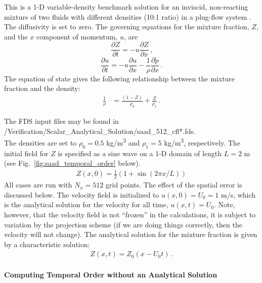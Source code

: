 \documentclass[11pt]{book}
\begin{document}
\noindent This is a 1-D variable-density benchmark solution for an inviscid, non-reacting mixture of two fluids with different densities (10:1 ratio) in a plug-flow system \cite{Biglari:2013}.  The diffusivity is set to zero.  The governing equations for the mixture fraction, $Z$, and the $x$ component of momentum, $u$, are
\begin{equation}
\frac{\partial Z}{\partial t} = - u\frac{\partial Z}{\partial x} \,\mbox{,}
\end{equation}
\begin{equation}
\frac{\partial u}{\partial t} = - u\frac{\partial u}{\partial x} - \frac{1}{\rho} \frac{\partial \tilde{p}}{\partial x} \,\mbox{.}
\end{equation}
The equation of state gives the following relationship between the mixture fraction and the density:
\begin{align}
\frac{1}{\rho} &= \frac{(1-Z)}{\rho_0} + \frac{Z}{\rho_1} \,\mbox{.}
\end{align}

The FDS input files may be found in\\
{\ct /Verification/Scalar\_Analytical\_Solution/saad\_512\_cfl*.fds}.\\

\noindent The densities are set to $\rho_0 = 0.5$ \si{kg/m^3} and $\rho_1 = 5$ \si{kg/m^3}, respectively.  The initial field for $Z$ is specified as a sine wave on a 1-D domain of length $L=2$ m (see Fig.~\ref{fig:saad_temporal_order} below).
\begin{align}
Z(x,0) = \frac{1}{2}\left( 1 + \sin(2\pi x/L) \right)
\end{align}
All cases are run with $N_x = 512$ grid points.  The effect of the spatial error is discussed below. The velocity field is initialized to $u(x,0) = U_0 = 1$ m/s, which is the analytical solution for the velocity for all time, $u(x,t) = U_0$.  Note, however, that the velocity field is not ``frozen'' in the calculations, it is subject to variation by the projection scheme (if we are doing things correctly, then the velocity will not change).  The analytical solution for the mixture fraction is given by a characteristic solution:
\begin{align}
Z(x,t) = Z_0(x-U_0 t) \,\mbox{.}
\end{align}

\paragraph{Computing Temporal Order without an Analytical Solution}
\end{document}
